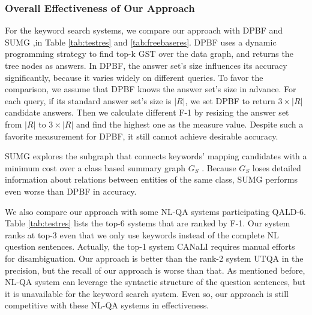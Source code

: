 \subsubsection{Overall Effectiveness of Our Approach}
For the keyword search systems, we compare our approach with DPBF and SUMG ,in Table \ref{tab:testres} and \ref{tab:freebaseres}. DPBF uses a dynamic programming strategy to find top-k GST over the data graph, and returns the tree nodes as answers. In DPBF, the answer set's size influences its accuracy significantly, because it varies widely on different queries.
To favor the comparison, we assume that DPBF knows the answer set's size in advance. For each query, if its standard answer set's size is $|R|$, we set DPBF to return $3 \times |R|$ candidate answers. Then we calculate different F-1 by resizing the answer set from $|R|$ to $3\times |R|$ and find the highest one as the measure value. Despite such a favorite measurement for DPBF, it still cannot achieve desirable accuracy.

SUMG explores the subgraph that connects keywords' mapping candidates with a minimum cost over a class based summary graph $G_S$ \cite{tran2009top}.
Because $G_S$ loses detailed information about relations between entities of the same class, SUMG performs even worse than DPBF in accuracy.


We also compare our approach with some NL-QA systems participating QALD-6. Table \ref{tab:testres} lists the top-6 systems that are ranked by F-1. Our system ranks at top-3 even that we only use keywords instead of the complete NL question sentences. Actually, the top-1 system CANaLI \cite{atzori2016answering} requires manual efforts for disambiguation. Our approach is better than the rank-2 system UTQA in the precision, but the recall of our approach is worse than that. As mentioned before, NL-QA system can leverage the syntactic structure of the question sentences, but it is unavailable for the keyword search system. Even so, our approach is still competitive with these NL-QA systems in effectiveness.

